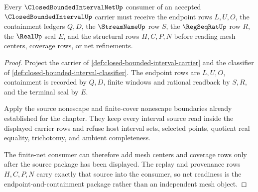 \begin{theorem}
\label{thm:closed-bounded-interval-root-net-readiness}
Every $\ClosedBoundedIntervalNetUp$ consumer of an accepted $\ClosedBoundedIntervalUp$ carrier must receive the endpoint rows $L,U,O$, the containment ledgers $Q,D$, the $\StreamNameUp$ row $S$, the $\RegSeqRatUp$ row $R$, the $\RealUp$ seal $E$, and the structural rows $H,C,P,N$ before reading mesh centers, coverage rows, or net refinements.
\end{theorem}
\begin{proof}
Project the carrier of \autoref{def:closed-bounded-interval-carrier} and the classifier of \autoref{def:closed-bounded-interval-classifier}. The endpoint rows are $L,U,O$, containment is recorded by $Q,D$, finite windows and rational readback by $S,R$, and the terminal seal by $E$.

Apply the source nonescape and finite-cover nonescape boundaries already established for the chapter. They keep every interval source read inside the displayed carrier rows and refuse host interval sets, selected points, quotient real equality, trichotomy, and ambient completeness.

The finite-net consumer can therefore add mesh centers and coverage rows only after the source package has been displayed. The replay and provenance rows $H,C,P,N$ carry exactly that source into the consumer, so net readiness is the endpoint-and-containment package rather than an independent mesh object.
\end{proof}

